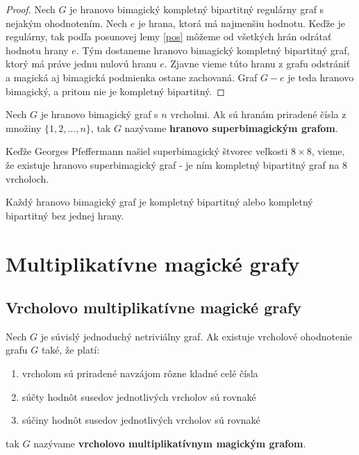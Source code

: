 \begin{proof} Nech $G$ je hranovo bimagický kompletný bipartitný regulárny graf s nejakým ohodnotením. Nech $e$ je hrana, ktorá má najmenšiu hodnotu. Keďže je regulárny, tak podľa posunovej lemy \ref{pos} môžeme od všetkých hrán odrátať hodnotu hrany $e$. Tým dostaneme hranovo bimagický kompletný bipartitný graf, ktorý má práve jednu nulovú hranu $e$. Zjavne vieme túto hranu z grafu odstrániť a magická aj bimagická podmienka ostane zachovaná. Graf $G - e$ je teda hranovo bimagický, a pritom nie je kompletný bipartitný.
\end{proof}

\begin{definition} Nech $G$ je hranovo bimagický graf s $n$ vrcholmi. Ak sú hranám priradené čísla z množiny $\{1, 2, \dots , n\}$, tak $G$ nazývame \textbf{hranovo superbimagickým grafom}.
\end{definition} 

Keďže Georges Pfeffermann našiel superbimagický štvorec veľkosti $8 \times 8$, vieme, že existuje hranovo superbimagický graf - je ním kompletný bipartitný graf na $8$ vrcholoch.

\begin{hypothesis} Každý hranovo bimagický graf je kompletný bipartitný alebo kompletný bipartitný bez jednej hrany.
\end{hypothesis} 



\section{Multiplikatívne magické grafy}

\subsection{Vrcholovo multiplikatívne magické grafy}

\begin{definition} Nech $G$ je súvislý jednoduchý netriviálny graf. Ak existuje vrcholové ohodnotenie grafu $G$ také, že platí:

\begin{enumerate}
\item vrcholom sú priradené navzájom rôzne kladné celé čísla
\item súčty hodnôt susedov jednotlivých vrcholov sú rovnaké
\item súčiny hodnôt susedov jednotlivých vrcholov sú rovnaké
\end{enumerate}

tak $G$ nazývame \textbf{vrcholovo multiplikatívnym magickým grafom}.
\end{definition} 

